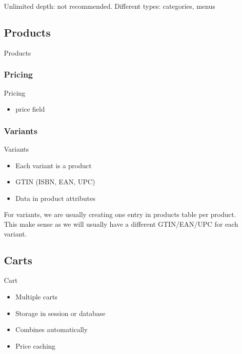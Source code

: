 Unlimited depth: not recommended.
Different types: categories, menus

\subsection{Products}
\begin{frame}{Products}
\end{frame}

\subsubsection{Pricing}
\begin{frame}{Pricing}
\begin{itemize}
\item price field
\end{itemize}
\end{frame}


\subsubsection{Variants}
\begin{frame}{Variants}
\begin{itemize}
\item Each variant is a product
\item GTIN (ISBN, EAN, UPC)
\item Data in product attributes
\end{itemize}
\end{frame}

For variants, we are usually creating one entry in products table per
product. This make sense as we will usually have a different GTIN/EAN/UPC
for each variant.

\subsection{Carts}
\begin{frame}{Cart}
\begin{itemize}
\item Multiple carts
\item Storage in session or database
\item Combines automatically
\item Price caching
\end{itemize}
\end{frame}

